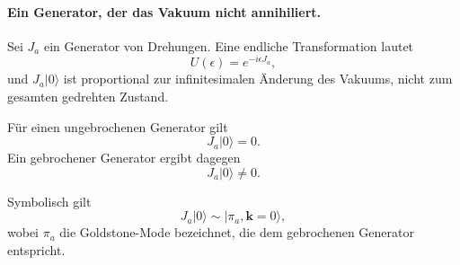 \paragraph{Ein Generator, der das Vakuum nicht annihiliert.}
Sei \(J_a\) ein Generator von Drehungen. Eine endliche Transformation lautet
\begin{equation}
U(\epsilon)=e^{-i\epsilon J_a},
\end{equation}
und \(J_a|0\rangle\) ist proportional zur infinitesimalen Änderung des Vakuums, nicht zum gesamten gedrehten Zustand.

\begin{classroomqa}
\end{classroomqa}

Für einen ungebrochenen Generator gilt
\begin{equation}
J_a|0\rangle=0.
\label{eq:l9-unbroken-generator}
\end{equation}
Ein gebrochener Generator ergibt dagegen
\begin{equation}
J_a|0\rangle\neq0.
\label{eq:l9-broken-generator}
\end{equation}

\begin{classroomqa}
\end{classroomqa}

\begin{classroomqa}
\end{classroomqa}

Symbolisch gilt
\begin{equation}
J_a|0\rangle
\sim
|\pi_a,\mathbf k=0\rangle,
\label{eq:l9-generator-goldstone}
\end{equation}
wobei \(\pi_a\) die Goldstone-Mode bezeichnet, die dem gebrochenen Generator entspricht.

